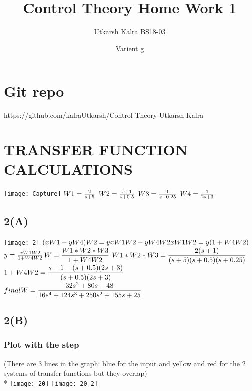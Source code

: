 \documentclass{article}
\title{Control Theory Home Work 1}
\author{Utkarsh Kalra BS18-03 }
\date{Varient g}
\begin{document}
\maketitle

\section{Git repo}
https://github.com/kalraUtkarsh/Control-Theory-Utkarsh-Kalra


\section{TRANSFER FUNCTION CALCULATIONS}
\texttt{[image: Capture]}
$
W1 =\frac{2}{s+5}\\*
$
$
W2 = \frac{s+1}{s+0.5}\\*
$
$
W3 = \frac{1}{s+0.25}\\*
$
$
W4 = \frac{1}{2s+3}\\*
$
\subsection{2(A)}
\texttt{[image: 2]}
$(xW1 - yW4)W2 = y\\*\\*
xW1W2 - yW4W2\\*\\*
xW1W2 = y(1+W4W2)\\*\\*
$$
y = \frac{xW1W2}{1+W4W2}\\*\\*
$$
W = {\displaystyle\frac{W1*W2*W3}{1+W4W2}}\\*
$
$
W1*W2*W3 = {\displaystyle\frac{2(s+1)}{(s+5)(s+0.5)(s+0.25)}}\\*\\*\\*
$
$
1+W4W2 = {\displaystyle\frac{s+1+(s+0.5)(2s+3)}{(s+0.5)(2s+3)}}\\*\\*\\*
$
$
final W = {\displaystyle\frac{32s^2+80s+48}{16s^4+124s^3+250s^2+155s+25}}\\*\\*\\*$
\subsection{2(B)}
\subsubsection{Plot with the step}
(There are 3 lines in the graph: blue for the input and yellow and red for the 2 systems of transfer functions but they overlap)\\*
\texttt{[image: 20]}
\texttt{[image: 20\_2]}
\end{document}
